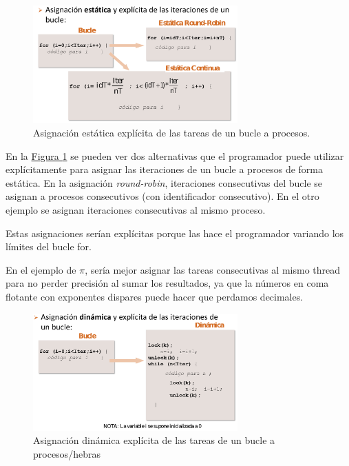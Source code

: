 \documentclass[10pt,a4paper,spanish]{report}
\begin{document}
\begin{figure}[!h]
    \centering
    \includegraphics[width=0.7\textwidth]{43}
    \caption{Asignación estática explícita de las tareas de un bucle a procesos.}
    \label{tipos_estatica_asig}
\end{figure}

En la \hyperref[tipos_estatica_asig]{Figura \ref*{tipos_estatica_asig}} se pueden ver dos alternativas que el programador puede utilizar explícitamente para asignar las iteraciones de un bucle a procesos de forma estática. En la asignación \textcolor[rgb]{0.2,0.4,0.8}{\textit{round-robin}}, iteraciones consecutivas del bucle se asignan a procesos consecutivos (con identificador consecutivo). En el otro ejemplo se asignan iteraciones consecutivas al mismo proceso. 

Estas asignaciones serían explícitas porque las hace el programador variando los límites del bucle for.

En el ejemplo de $\pi$, sería mejor asignar las tareas consecutivas al mismo thread para no perder precisión al sumar los resultados, ya que la números en coma flotante con exponentes dispares puede hacer que perdamos decimales.

\begin{figure}[!h]
\centering
\includegraphics[width=0.7\textwidth]{44}
\caption{Asignación dinámica explícita de las tareas de un bucle a procesos/hebras}
\label{tipos_din_asig}
\end{figure}
\end{document}
